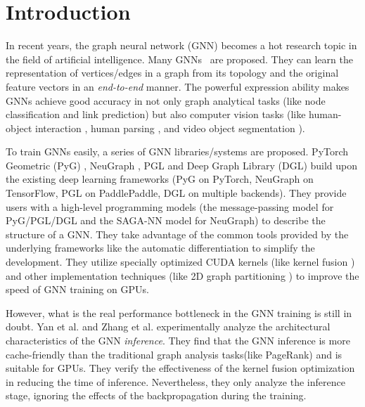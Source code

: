 \section{Introduction}

In recent years, the graph neural network (GNN) becomes a hot research topic in the field of artificial intelligence.
Many GNNs~\cite{kipf2017_gcn, defferrad2016_chebnet, li2018_agcn,li2015_ggnn, hamilton2017_graphsage, huang2018_gat, zhang2018_gaan} are proposed.
They can learn the representation of vertices/edges in a graph from its topology and the original feature vectors in an \emph{end-to-end} manner.
The powerful expression ability makes GNNs achieve good accuracy in not only graph analytical tasks \cite{zhou2018_gnn_review, zhang2018_gnn_survey, comprehensive-survey-wu-2020} (like node classification and link prediction) but also computer vision tasks (like human-object interaction \cite{qi2018_learning_humanobject}, human parsing \cite{wang2020_hierarchical_human_parsing}, and video object segmentation \cite{wang2019_zeroshot_video}).

To train GNNs easily, a series of GNN libraries/systems \cite{PyG, DGL, ma2019_neugraph, zhu2019_aligraph, PGL} are proposed.
PyTorch Geometric (PyG) \cite{PyG}, NeuGraph \cite{ma2019_neugraph}, PGL \cite{PGL} and Deep Graph Library (DGL) \cite{DGL} build upon the existing deep learning frameworks (PyG on PyTorch, NeuGraph on TensorFlow, PGL on PaddlePaddle, DGL on multiple backends).
They provide users with a high-level programming models (the message-passing model for PyG/PGL/DGL and the SAGA-NN model for NeuGraph) to describe the structure of a GNN.
They take advantage of the common tools provided by the underlying frameworks like the automatic differentiation to simplify the development.
They utilize specially optimized CUDA kernels (like kernel fusion \cite{DGL} \cite{ma2019_neugraph}) and other implementation techniques (like 2D graph partitioning \cite{ma2019_neugraph}) to improve the speed of GNN training on GPUs.

However, what is the real performance bottleneck in the GNN training is still in doubt.
Yan et al. \cite{yan2020_characterizing_gcn} and Zhang et al. \cite{zhang2020_analysis_neugraph} experimentally analyze the architectural characteristics of the GNN \emph{inference}.
They find that the GNN inference is more cache-friendly than the traditional graph analysis tasks(like PageRank) and is suitable for GPUs.
They verify the effectiveness of the kernel fusion optimization in reducing the time of inference.
Nevertheless, they only analyze the inference stage, ignoring the effects of the backpropagation during the training.

